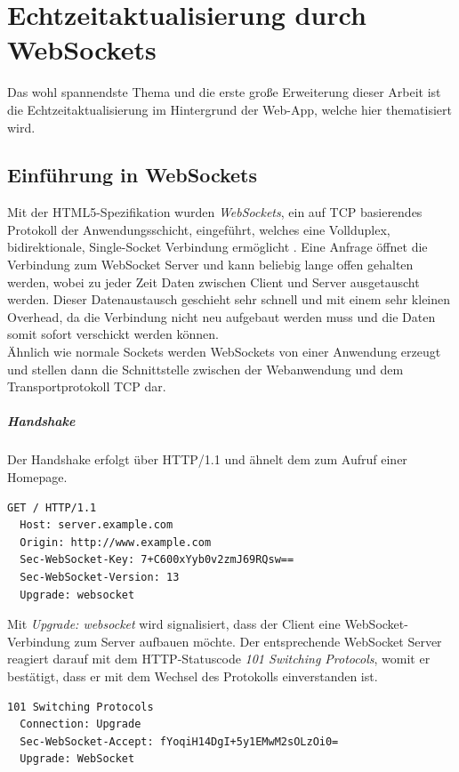 \chapter{Echtzeitaktualisierung durch WebSockets}
Das wohl spannendste Thema und die erste große Erweiterung dieser Arbeit ist die Echtzeitaktualisierung im Hintergrund der Web-App, welche hier thematisiert wird.

\section{Einführung in WebSockets}
Mit der HTML5-Spezifikation wurden \emph{WebSockets}, ein auf TCP basierendes Protokoll der Anwendungsschicht, eingeführt, welches eine Vollduplex, bidirektionale, Single-Socket Verbindung ermöglicht \cite[S. 7]{ws}. Eine Anfrage öffnet die Verbindung zum WebSocket Server und kann beliebig lange offen gehalten werden, wobei zu jeder Zeit Daten zwischen Client und Server ausgetauscht werden. Dieser Datenaustausch geschieht sehr schnell und mit einem sehr kleinen Overhead, da die Verbindung nicht neu aufgebaut werden muss und die Daten somit sofort verschickt werden können.\\
Ähnlich wie \glqq normale\grqq{} Sockets werden WebSockets von einer Anwendung erzeugt und stellen dann die Schnittstelle zwischen der Webanwendung und dem Transportprotokoll TCP dar. 

\paragraph{Handshake} 
Der Handshake erfolgt über HTTP/1.1 und ähnelt dem zum Aufruf einer Homepage.
\\
\begin{lstlisting}[captionpos=b, caption=HTTP Request des Clients {\cite[S. 6]{rfc6455:handshake}}]
  GET / HTTP/1.1
  Host: server.example.com
  Origin: http://www.example.com
  Sec-WebSocket-Key: 7+C600xYyb0v2zmJ69RQsw==
  Sec-WebSocket-Version: 13
  Upgrade: websocket
\end{lstlisting}

Mit \emph{Upgrade: websocket} wird signalisiert, dass der Client eine WebSocket-Verbindung zum Server aufbauen möchte. Der entsprechende WebSocket Server reagiert darauf mit dem HTTP-Statuscode \emph{101 Switching Protocols}, womit er bestätigt, dass er mit dem Wechsel des Protokolls einverstanden ist.
\\
\begin{lstlisting}[captionpos=b, caption=HTTP Response des Servers {\cite[S. 8]{rfc6455:handshake}}]
  101 Switching Protocols
  Connection: Upgrade
  Sec-WebSocket-Accept: fYoqiH14DgI+5y1EMwM2sOLzOi0=
  Upgrade: WebSocket
\end{lstlisting}

